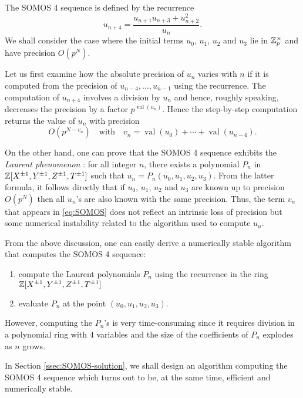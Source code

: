 \documentclass{lms}
\DeclareMathOperator{\val}{val}
\begin{document}
The SOMOS 4 sequence \cite{somos:89a} is defined by the recurrence
\[
u_{n+4} = \frac{u_{n+1} u_{n+3} + u_{n+2}^2}{u_n}.
\]
We shall consider the case where the initial
terms $u_0$, $u_1$, $u_2$ and $u_3$ lie in $\mathbb Z_p^\times$ and have precision $O(p^N)$.

Let us first examine how the absolute precision of $u_n$ varies with $n$
if it is computed from the precision of $u_{n-4}, \ldots, u_{n-1}$ using the recurrence.
The computation of $u_{n+4}$ involves a division by $u_n$ and hence, roughly speaking,
decreases the precision by a factor $p^{\val(u_n)}$.  Hence the
step-by-step computation returns the value of $u_n$ with precision
\begin{equation}
\label{eq:SOMOS}
O(p^{N-v_n})
\quad \text{with}\quad
v_n = \val(u_0) + \cdots + \val(u_{n-4}).
\end{equation}

On the other hand, one can prove that the SOMOS 4 sequence 
exhibits the \emph{Laurent phenomenon} \cite{fomin-zelevinsky:02a}: for all integer 
$n$, there exists a polynomial $P_n$ in $\mathbb Z[X^{\pm 1}, Y^{\pm 1}, Z^{\pm 
1}, T^{\pm 1}]$ such that $u_n = P_n(u_0, u_1, u_2, u_3)$.
From the latter formula, it follows directly that if $u_0$, $u_1$,
$u_2$ and $u_3$ are known up to precision $O(p^N)$ then all $u_n$'s
are also known with the same precision. Thus, the term $v_n$ that 
appears in \eqref{eq:SOMOS} does not reflect an intrinsic loss of
precision but some numerical instability related to the algorithm used to compute $u_n$.

\begin{rmk}
From the above discussion, one can easily derive a numerically stable 
algorithm that computes the SOMOS 4 sequence: 
\begin{enumerate}
\item compute the Laurent polynomials $P_n$ using the recurrence in 
the ring $\mathbb Z[X^{\pm 1}, Y^{\pm 1}, Z^{\pm 1}, T^{\pm 1}]$
\item evaluate $P_n$ at the point $(u_0, u_1, u_2, u_3)$.
\end{enumerate}
However, computing the $P_n$'s is very time-consuming since it requires 
division in a polynomial ring with $4$ variables and the
size of the coefficients of $P_n$ explodes as $n$ grows.

In Section \ref{ssec:SOMOS-solution}, we shall design an algorithm computing 
the SOMOS 4 sequence which turns out to be, at the same time, efficient 
and numerically stable.
\end{rmk}
\end{document}
